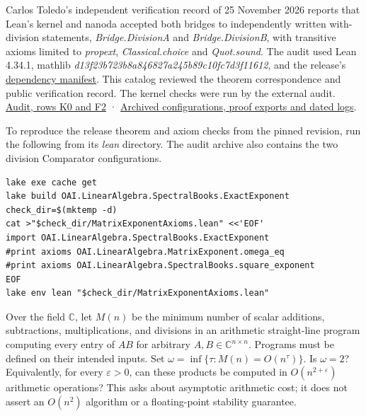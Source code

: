\documentclass[11pt,a4paper]{article}
\makeatletter
\renewcommand{\subsection}{\Needspace{4\baselineskip}\@startsection{subsection}{2}{0pt}{9pt plus 1pt minus 1pt}{3pt}{\sffamily\bfseries\normalsize\color{ink}}}
\makeatother
\begin{document}
Carlos Toledo's independent verification record of 25 November 2026
reports that Lean's kernel and nanoda accepted both bridges to
independently written with-division statements,
\textit{Bridge.DivisionA} and \textit{Bridge.DivisionB}, with transitive
axioms limited to \textit{propext}, \textit{Classical.choice} and
\textit{Quot.sound}. The audit used Lean 4.34.1, mathlib
\textit{d13f23b723b8a846827a245b89c10fc7d3f11612}, and the release's
\href{https://github.com/openai/math/blob/92b516ef8e2abf66c3db7aa31438d3010bc7956f/lean/lake-manifest.json}{dependency
manifest}. This catalog reviewed the theorem correspondence and public
verification record. The kernel checks were run by the external audit.
\href{https://carlostoledo.co/omega/}{Audit, rows K0 and F2} ·
\href{https://doi.org/10.5281/zenodo.24537370}{Archived configurations,
proof exports and dated logs}.

To reproduce the release theorem and axiom checks from the pinned
revision, run the following from its \textit{lean} directory. The audit
archive also contains the two division Comparator configurations.

\begin{verbatim}
lake exe cache get
lake build OAI.LinearAlgebra.SpectralBooks.ExactExponent
check_dir=$(mktemp -d)
cat >"$check_dir/MatrixExponentAxioms.lean" <<'EOF'
import OAI.LinearAlgebra.SpectralBooks.ExactExponent
#print axioms OAI.LinearAlgebra.MatrixExponent.omega_eq
#print axioms OAI.LinearAlgebra.SpectralBooks.square_exponent
EOF
lake env lean "$check_dir/MatrixExponentAxioms.lean"
\end{verbatim}

\subsection{Problem statement}\label{problem-statement}

Over the field \(\mathbb C\), let \(M(n)\) be the minimum number of
scalar additions, subtractions, multiplications, and divisions in an
arithmetic straight-line program computing every entry of \(AB\) for
arbitrary \(A,B\in\mathbb C^{n\times n}\). Programs must be defined on
their intended inputs. Set \(\omega=\inf\{\tau:M(n)=O(n^\tau)\}\). Is
\(\omega=2\)? Equivalently, for every \(\varepsilon>0\), can these
products be computed in \(O(n^{2+\varepsilon})\) arithmetic operations?
This asks about asymptotic arithmetic cost; it does not assert an
\(O(n^2)\) algorithm or a floating-point stability guarantee.
\end{document}
